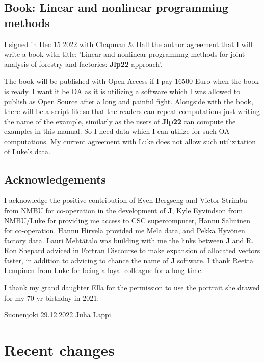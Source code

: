  
\subsection*{Book: Linear and nonlinear programming methods} 
I signed in Dec 15 2022 with Chapman \& Hall the author agreement that I will write 
a book with title: 'Linear and nonlinear programmng methods for joint analysis of forestry 
and factories: \textbf{Jlp22} approach'. 
 
The book will be published with Open Access if I pay 16500 Euro when the book is ready. 
I want it be OA as it is utilizing a software which I was allowed to publish as Open Source after a long 
and painful fight. Alongside with the book, there will be a script file so that the readers 
can repeat computations just writing the name of the example, similarly as the users 
of \textbf{Jlp22} can compute the examples in this manual. So I need data which I can utilize for such OA 
computations. My current agreement with Luke does not allow such utilizitation of Luke's data. 
 
 
 
 
\subsection*{Acknowledgements} 
 
 
 
I acknowledge the positive contribution of 
Even Bergseng and Victor Strimbu from NMBU for co-operation in the development of \textbf{J}, Kyle Eyvindson from NMBU/Luke for 
providing me access to CSC supercomputer, Hannu Salminen for co-operation. 
Hannu Hirvel\"a  provided me Mela data, and Pekka Hyv\"onen factory data. 
Lauri Meht\"atalo was building with me the links between \textbf{J} and R. 
Ron Shepard adviced in Fortran Discourse to make expansion of allocated 
vectors faster, in addition to advicing to chance the name of \textbf{J} software. 
I thank Reetta Lempinen from Luke for being a loyal colleague for a long time. 
 
 
I thank my grand daughter Ella 
for the permission to use the portrait she drawed for my 70 yr birthday in 2021. 
 
\vspace{0.5cm} 
Suonenjoki 29.12.2022 
\vspace{0.5cm} 
Juha Lappi 
 
\section{Recent changes} 
\label{changes} 
 

